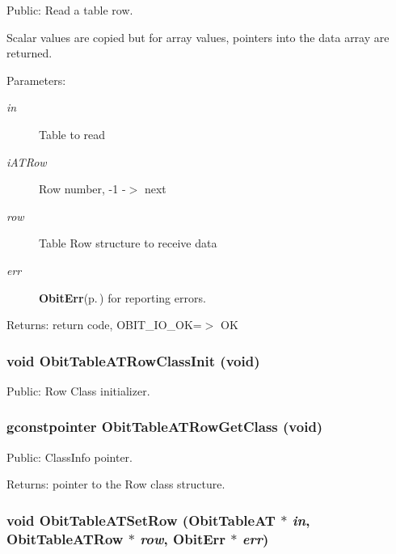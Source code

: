 Public: Read a table row. 

Scalar values are copied but for array values, pointers into the data array are returned. \begin{Desc}
\item[Parameters:]
\begin{description}
\item[{\em in}]Table to read \item[{\em i\-ATRow}]Row number, -1 -$>$ next \item[{\em row}]Table Row structure to receive data \item[{\em err}]{\bf Obit\-Err}{\rm (p.\,\pageref{structObitErr})} for reporting errors. \end{description}
\end{Desc}
\begin{Desc}
\item[Returns:]return code, OBIT\_\-IO\_\-OK=$>$ OK \end{Desc}
\subsubsection{\setlength{\rightskip}{0pt plus 5cm}void Obit\-Table\-ATRow\-Class\-Init (void)}\label{ObitTableAT_8h_a7}


Public: Row Class initializer. 

\subsubsection{\setlength{\rightskip}{0pt plus 5cm}gconstpointer Obit\-Table\-ATRow\-Get\-Class (void)}\label{ObitTableAT_8h_a9}


Public: Class\-Info pointer. 

\begin{Desc}
\item[Returns:]pointer to the Row class structure. \end{Desc}
\subsubsection{\setlength{\rightskip}{0pt plus 5cm}void Obit\-Table\-ATSet\-Row ({\bf Obit\-Table\-AT} $\ast$ {\em in}, {\bf Obit\-Table\-ATRow} $\ast$ {\em row}, {\bf Obit\-Err} $\ast$ {\em err})}\label{ObitTableAT_8h_a19}


